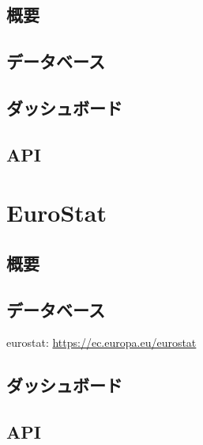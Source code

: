 \documentclass[
  xelatex, ja=standard]{bxjsbook}
\theoremstyle{definition}
\theoremstyle{definition}
\theoremstyle{definition}
\theoremstyle{definition}
\theoremstyle{remark}
\begin{document}
\hypertarget{ux6982ux8981-7}{%
\subsection{概要}\label{ux6982ux8981-7}}

\hypertarget{ux30c7ux30fcux30bfux30d9ux30fcux30b9-5}{%
\subsection{データベース}\label{ux30c7ux30fcux30bfux30d9ux30fcux30b9-5}}

\hypertarget{ux30c0ux30c3ux30b7ux30e5ux30dcux30fcux30c9-5}{%
\subsection{ダッシュボード}\label{ux30c0ux30c3ux30b7ux30e5ux30dcux30fcux30c9-5}}

\hypertarget{api-5}{%
\subsection{API}\label{api-5}}

\hypertarget{eurostat}{%
\section{EuroStat}\label{eurostat}}

\hypertarget{ux6982ux8981-8}{%
\subsection{概要}\label{ux6982ux8981-8}}

\hypertarget{ux30c7ux30fcux30bfux30d9ux30fcux30b9-6}{%
\subsection{データベース}\label{ux30c7ux30fcux30bfux30d9ux30fcux30b9-6}}

eurostat: \url{https://ec.europa.eu/eurostat}

\hypertarget{ux30c0ux30c3ux30b7ux30e5ux30dcux30fcux30c9-6}{%
\subsection{ダッシュボード}\label{ux30c0ux30c3ux30b7ux30e5ux30dcux30fcux30c9-6}}

\hypertarget{api-6}{%
\subsection{API}\label{api-6}}
\end{document}
